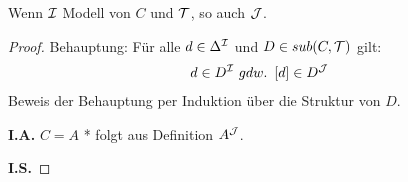 \begin{theorem} 
    \label{thm:filtration}
Wenn $\mathcal{I}$ Modell von $C$ und $\mathcal{T}$, so auch $\mathcal{J}$.
\end{theorem}

\begin{tafel}\mbox{}
\begin{proof}
    Behauptung:
Für alle $d \in \Delta^{\mathcal{I}}$ und $D \in sub(C,\mathcal{T})$ gilt:
\begin{align*}
d \in D^{\mathcal{I}}\ gdw.\ \left\lbrack d \right\rbrack \in D^{\mathcal{J}}
\end{align*}
Beweis der Behauptung per Induktion über die Struktur von $D$.

\textbf{I.A.} $C = A$ * folgt aus Definition $A^{\mathcal{J}}$.

\textbf{I.S.}


\end{proof}
\end{tafel}
